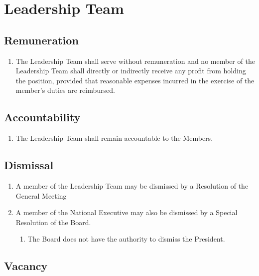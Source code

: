 \section{Leadership Team}
\label{leadership-team}

\subsection{Remuneration}
\label{leadership-team-remuneration}

\begin{enumerate}
 \item The Leadership Team shall serve without remuneration and no member of the Leadership Team shall directly or indirectly receive any profit from holding the position, provided that reasonable expenses incurred in the exercise of the member’s duties are reimbursed.
\end{enumerate}

\subsection{Accountability}
\label{leadership-team-accountability}

\begin{enumerate}
 \item The Leadership Team shall remain accountable to the Members.
\end{enumerate}

\subsection{Dismissal}
\label{leadership-team-dismissal}

\begin{enumerate}
 \item A member of the Leadership Team may be dismissed by a Resolution of the General Meeting
 \item A member of the National Executive may also be dismissed by a Special Resolution of the Board.
  \begin{enumerate}
   \item The Board does not have the authority to dismiss the President.
  \end{enumerate}
\end{enumerate}

\subsection{Vacancy}
\label{leadership-team-vacancy}

